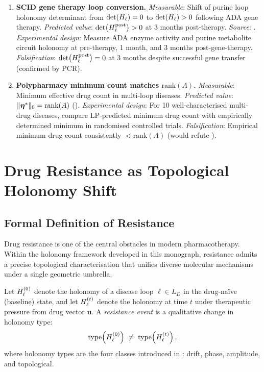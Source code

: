 \begin{enumerate}[label=\textbf{M\arabic*.}, leftmargin=3em]
\item \textbf{SCID gene therapy loop conversion.}
  \emph{Measurable}: Shift of purine loop holonomy determinant from
    $\det(H_\ell) = 0$ to $\det(H_\ell) > 0$ following ADA gene therapy.
  \emph{Predicted value}: $\det(H_\ell^{\mathrm{post}}) > 0$ at 3 months post-therapy.
  \emph{Source}: .
  \emph{Experimental design}: Measure ADA enzyme activity and purine metabolite
    circuit holonomy at pre-therapy, 1 month, and 3 months post-gene-therapy.
  \emph{Falsification}: $\det(H_\ell^{\mathrm{post}}) = 0$ at 3 months despite
    successful gene transfer (confirmed by PCR).

\item \textbf{Polypharmacy minimum count matches $\mathrm{rank}(A)$.}
  \emph{Measurable}: Minimum effective drug count in multi-loop diseases.
  \emph{Predicted value}: $\|\boldsymbol{\eta}^*\|_0 = \mathrm{rank}(A)$ ().
  \emph{Experimental design}: For 10 well-characterised multi-drug diseases,
    compare LP-predicted minimum drug count with empirically determined minimum
    in randomised controlled trials.
  \emph{Falsification}: Empirical minimum drug count consistently $< \mathrm{rank}(A)$
    (would refute ).

\end{enumerate}

\section{Drug Resistance as Topological Holonomy Shift}
\label{sec:ch10-resistance-dynamics}

\subsection{Formal Definition of Resistance}

Drug resistance is one of the central obstacles in modern pharmacotherapy.
Within the holonomy framework developed in this monograph, resistance admits a
precise topological characterisation that unifies diverse molecular mechanisms
under a single geometric umbrella.

\begin{definition}
\label{def:ch10-resistance}
Let $H_\ell^{(0)}$ denote the holonomy of a disease loop $\ell \in L_D$ in the
drug-na\"{i}ve (baseline) state, and let $H_\ell^{(t)}$ denote the holonomy at
time $t$ under therapeutic pressure from drug vector $\mathbf{u}$.  A
\emph{resistance event} is a qualitative change in holonomy type:
\begin{equation}
  \label{eq:ch10-resistance-event}
  \mathrm{type}\!\left(H_\ell^{(0)}\right) \;\neq\;
  \mathrm{type}\!\left(H_\ell^{(t)}\right),
\end{equation}
where holonomy types are the four classes introduced in
: drift, phase, amplitude, and topological.
\end{definition}


